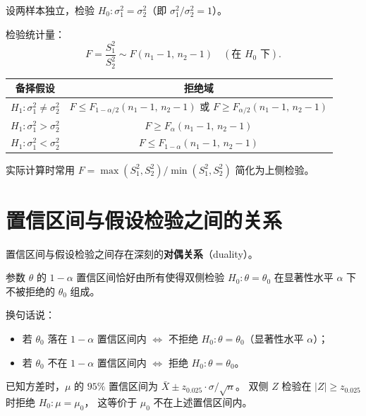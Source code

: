 设两样本独立，检验 $H_0: \sigma_1^2 = \sigma_2^2$（即 $\sigma_1^2 / \sigma_2^2 = 1$）。

检验统计量：
\begin{equation}
    F = \frac{S_1^2}{S_2^2} \sim F(n_1-1,\, n_2-1) \quad (\text{在 } H_0 \text{ 下}).
\end{equation}

\begin{center}
\begin{tabular}{c|c}
    \toprule
    备择假设 & 拒绝域 \\
    \midrule
    $H_1: \sigma_1^2 \neq \sigma_2^2$ & $F \le F_{1-\alpha/2}(n_1-1,\,n_2-1)$ 或 $F \ge F_{\alpha/2}(n_1-1,\,n_2-1)$ \\
    $H_1: \sigma_1^2 > \sigma_2^2$    & $F \ge F_{\alpha}(n_1-1,\,n_2-1)$ \\
    $H_1: \sigma_1^2 < \sigma_2^2$    & $F \le F_{1-\alpha}(n_1-1,\,n_2-1)$ \\
    \bottomrule
\end{tabular}
\end{center}

\begin{remark}
实际计算时常用 $F = \max(S_1^2, S_2^2) / \min(S_1^2, S_2^2)$ 简化为上侧检验。
\end{remark}

\section{置信区间与假设检验之间的关系}

置信区间与假设检验之间存在深刻的\textbf{对偶关系}（duality）。

\begin{theorem}[置信区间与假设检验的对偶性]
参数 $\theta$ 的 $1-\alpha$ 置信区间恰好由所有使得双侧检验 $H_0: \theta = \theta_0$ 在显著性水平 $\alpha$ 下不被拒绝的 $\theta_0$ 组成。
\end{theorem}

换句话说：
\begin{itemize}
    \item 若 $\theta_0$ 落在 $1-\alpha$ 置信区间内 $\iff$ 不拒绝 $H_0: \theta = \theta_0$（显著性水平 $\alpha$）；
    \item 若 $\theta_0$ 不在 $1-\alpha$ 置信区间内 $\iff$ 拒绝 $H_0: \theta = \theta_0$。
\end{itemize}

\begin{example}[均值检验与置信区间的对应]
已知方差时，$\mu$ 的 $95\%$ 置信区间为 $\bar{X} \pm z_{0.025} \cdot \sigma/\sqrt{n}$。
双侧 $Z$ 检验在 $|Z| \ge z_{0.025}$ 时拒绝 $H_0: \mu = \mu_0$，
这等价于 $\mu_0$ 不在上述置信区间内。
\end{example}

